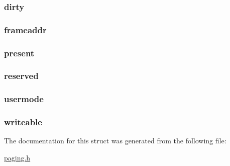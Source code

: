 \subsubsection[{dirty}]{ dirty}\label{structpage__entry_a3a32ba260115f27563a8197f17c291a6}
\hypertarget{structpage__entry_a95b631ccb680a6af3d4d4a4fda3ca440}{}
\subsubsection[{frameaddr}]{ frameaddr}\label{structpage__entry_a95b631ccb680a6af3d4d4a4fda3ca440}
\hypertarget{structpage__entry_a69718d61bbe7faf204d90744c9824c52}{}
\subsubsection[{present}]{ present}\label{structpage__entry_a69718d61bbe7faf204d90744c9824c52}
\hypertarget{structpage__entry_a428bdea224227681cbba9cb45f3cca62}{}
\subsubsection[{reserved}]{ reserved}\label{structpage__entry_a428bdea224227681cbba9cb45f3cca62}
\hypertarget{structpage__entry_a277f6a1db251178ac4c5bd2e58acf139}{}
\subsubsection[{usermode}]{ usermode}\label{structpage__entry_a277f6a1db251178ac4c5bd2e58acf139}
\hypertarget{structpage__entry_a421725c39c0745b022f36ab85b6cf3ce}{}
\subsubsection[{writeable}]{ writeable}\label{structpage__entry_a421725c39c0745b022f36ab85b6cf3ce}


The documentation for this struct was generated from the following file\+:\begin{DoxyCompactItemize}
\item 
\hyperlink{paging_8h}{paging.\+h}\end{DoxyCompactItemize}
